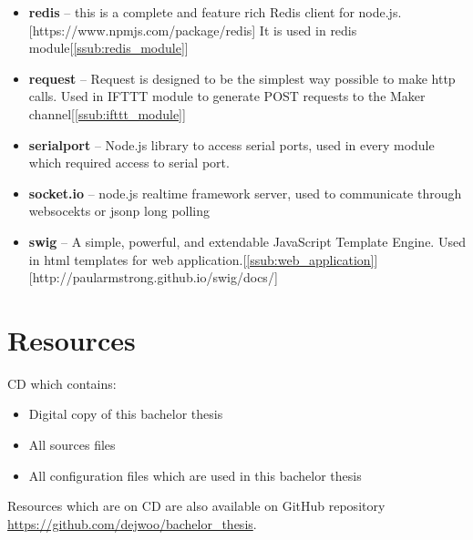 \begin{itemize}
    \item \textbf{redis} -- this is a complete and feature rich Redis client for node.js.[https://www.npmjs.com/package/redis] It is used in redis module[\ref{ssub:redis_module}]
    \item \textbf{request} -- Request is designed to be the simplest way possible to make http calls. Used in IFTTT module to generate POST requests to the Maker channel[\ref{ssub:ifttt_module}]
    \item \textbf{serialport} -- Node.js library to access serial ports, used in every module which required access to serial port.
    \item \textbf{socket.io} -- node.js realtime framework server, used to communicate through websocekts or jsonp long polling
    \item \textbf{swig} -- A simple, powerful, and extendable JavaScript Template Engine. Used in html templates for web application.[\ref{ssub:web_application}][http://paularmstrong.github.io/swig/docs/]
\end{itemize}


\chapter{Resources} %
\label{sec:resources}
CD which contains:
\begin{itemize}
\item Digital copy of this bachelor thesis
\item All sources files
\item All configuration files which are used in this bachelor thesis
\end{itemize}
Resources which are on CD are also available on GitHub repository \url{https://github.com/dejwoo/bachelor_thesis}.